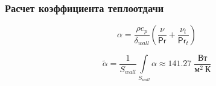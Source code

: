 \documentclass[10pt,xcolor={dvipsnames,table},aspectratio=169]{beamer}
\begin{document}
    \begin{frame}{}

        \justifying
        \normalsize

        \frametitle{Расчет коэффициента теплоотдачи}

        \[
            \alpha = \frac{\rho c_{p}}{\delta_{wall}} \left( \frac{\nu}{\textsf{Pr}} + \frac{\nu_{t}}{\textsf{Pr}_{t}} \right)
        \]

        \[
            \tilde{\alpha} = \frac{1}{S_{wall}} \int\limits_{S_{wall}} \alpha \approx 141.27 \; \frac{\mbox{Вт}}{\mbox{м}^2 \: \mbox{К}}
        \]

    \end{frame}
\end{document}
